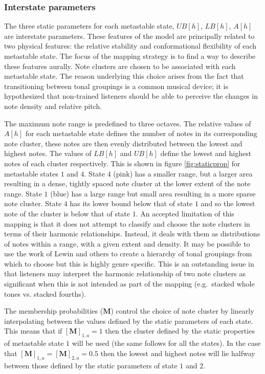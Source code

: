 \documentclass[a4paper,10pt,oneside]{article}
\begin{document}
\begin{sloppy}
\subsubsection{Interstate parameters}
The three static parameters for each metastable state, $UB[h]$, $LB[h]$, $A[h]$ are interstate parameters. These features of the model are principally related to two physical features: the relative stability and conformational flexibility of each metastable state. The focus of the mapping strategy is to find a way to describe these features aurally. Note clusters are chosen to be associated with each metastable state. The reason underlying this choice arises from the fact that transitioning between tonal groupings is a common musical device; it is hypothesized that non-trained listeners should be able to perceive the changes in note density and relative pitch. 

The maximum note range is predefined to three octaves. The relative values of $A[h]$ for each metastable state defines the number of notes in its corresponding note cluster, these notes are then evenly distributed between the lowest and highest notes. The values of $LB[h]$ and $UB[h]$ define the lowest and highest notes of each cluster respectively. This is shown in figure \ref{fig:staticprop} for metastable states $1$ and $4$. State $4$ (pink) has a smaller range, but a larger area resulting in a dense, tightly spaced note cluster at the lower extent of the note range. State $1$ (blue) has a large range but small area resulting in a more sparse note cluster.  State $4$ has its lower bound below that of state $1$ and so the lowest note of the cluster is below that of state $1$. An accepted limitation of this mapping is that it does not attempt to classify and choose the note clusters in terms of their harmonic relationships. Instead, it deals with them as distributions of notes within a range, with a given extent and density. It may be possible to use the work of Lewin \cite{Lewin2007} and others to create a hierarchy of tonal groupings from which to choose but this is highly genre specific. This is an outstanding issue in that listeners may interpret the harmonic relationship of two note clusters as significant when this is not intended as part of the mapping (e.g.\ stacked whole tones vs. stacked fourths).     

The membership probabilities ($\mathbf{M}$) control the choice of note cluster by linearly interpolating between the values defined by the static parameters of each state. This means that if $[\mathbf{M}]_{1,a}= 1$ then the cluster defined by the static properties of metastable state $1$ will be used (the same follows for all the states). In the case that $[\mathbf{M}]_{1,a}= [\mathbf{M}]_{2,a}=0.5$ then the lowest and highest notes will lie halfway between those defined by the static parameters of state $1$ and $2$. 


\end{sloppy}
\end{document}
